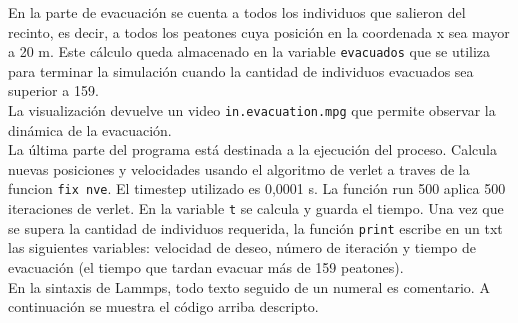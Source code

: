 En la parte de evacuación se cuenta a todos los individuos que salieron del recinto, es decir, a todos los peatones cuya posición en la coordenada x sea mayor a 20 m. Este cálculo queda almacenado en la variable {\tt evacuados} que se utiliza para terminar la simulación cuando la cantidad de individuos evacuados sea superior a 159. \\
La visualización devuelve un video {\tt in.evacuation.mpg} que permite observar la dinámica de la evacuación. \\
La última parte del programa está destinada a la ejecución del proceso. Calcula nuevas posiciones y velocidades usando el algoritmo de verlet a traves de la funcion {\tt fix nve}. El timestep utilizado es 0,0001 s. La función run 500 aplica 500 iteraciones de verlet. En la variable {\tt t} se calcula y guarda el tiempo. Una vez que se supera la cantidad de individuos requerida, la función {\tt print} escribe en un txt las siguientes variables: velocidad de deseo, número de iteración y  tiempo de evacuación (el tiempo que tardan evacuar más de 159 peatones).\\
En la sintaxis de Lammps, todo texto seguido de un numeral es comentario. A continuación se muestra el código arriba descripto.

